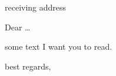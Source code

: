 \documentclass[DIN,%
               ngerman,%
               pagenumber=false,%
               parskip=half,%
               fromalign=left,%
               fromphone=true,%
               fromemail=true,%
               fromurl=false, %
               fromlogo=false,%
               fromrule=false]{scrlttr2}   %
\begin{document}
\begin{letter}
{%
receiving address
}

\opening{Dear \ldots}

some text I want you to read.

\closing{best regards,}
\end{letter}
\end{document}
